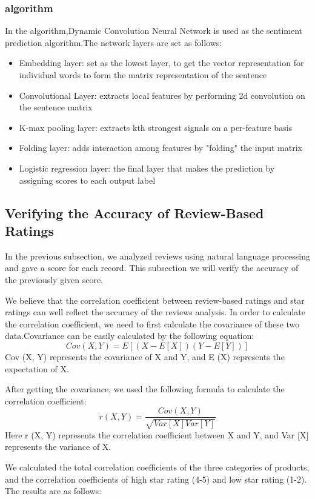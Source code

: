 \documentclass{mcmthesis}
\begin{document}
	\subsubsection{algorithm}
	In the algorithm,Dynamic Convolution Neural Network is used as the sentiment prediction algorithm.The network layers are set as follows:
	\begin{itemize}
		\item Embedding layer: set as the lowest layer, to get the vector representation for individual words to form the matrix representation of the sentence
		\item Convolutional Layer: extracts local features by performing 2d convolution on the sentence matrix
		\item K-max pooling layer: extracts kth strongest signals on a per-feature basis
		\item Folding layer: adds interaction among features by "folding" the input matrix
		\item Logistic regression layer: the final layer that makes the prediction by assigning scores to each output label
	\end{itemize}
	
	
	\subsection{Verifying the Accuracy of Review-Based Ratings}
	In the previous subsection, we analyzed reviews using natural language processing and gave a score for each record. This subsection we will verify the accuracy of the previously given score.
	
	We believe that the correlation coefficient between review-based ratings and star ratings can well reflect the accuracy of the reviews analysis. In order to calculate the correlation coefficient, we need to first calculate the covariance of these two data.Covariance can be easily calculated by the following equation:
	$$Cov(X,Y)=E[(X-E[X])(Y-E[Y])]$$
	Cov (X, Y) represents the covariance of X and Y, and E (X) represents the expectation of X.
	
	After getting the covariance, we used the following formula to calculate the correlation coefficient:
	$$r(X,Y)=\frac{Cov(X,Y)}{\sqrt{Var[X]Var[Y]}}$$
	Here r (X, Y) represents the correlation coefficient between X and Y, and Var [X] represents the variance of X.
	
	We calculated the total correlation coefficients of the three categories of products, and the correlation coefficients of high star rating (4-5) and low star rating (1-2). The results are as follows:
	
\end{document}
